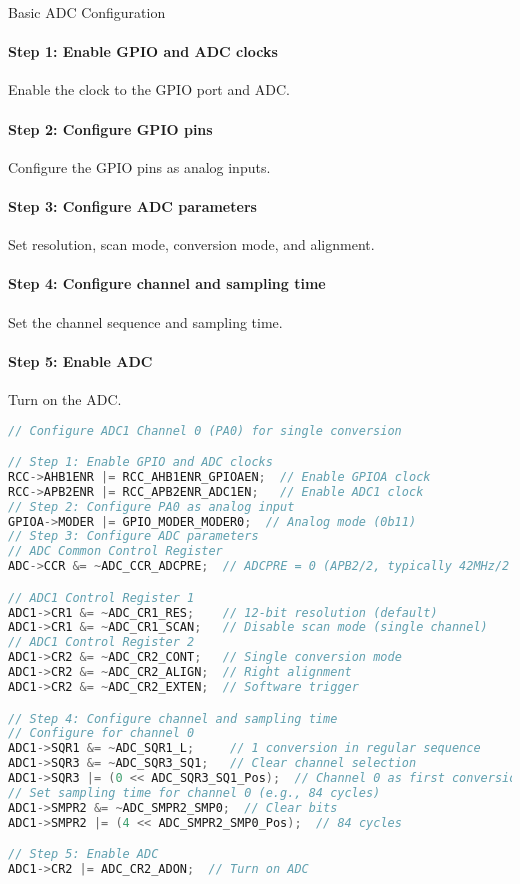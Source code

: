\multend

\begin{KR}{Basic ADC Configuration}
\paragraph{Step 1: Enable GPIO and ADC clocks}
Enable the clock to the GPIO port and ADC.
\paragraph{Step 2: Configure GPIO pins}
Configure the GPIO pins as analog inputs.
\paragraph{Step 3: Configure ADC parameters}
Set resolution, scan mode, conversion mode, and alignment.
\paragraph{Step 4: Configure channel and sampling time}
Set the channel sequence and sampling time.
\paragraph{Step 5: Enable ADC}
Turn on the ADC.

\begin{lstlisting}[language=C, style=basesmol]
// Configure ADC1 Channel 0 (PA0) for single conversion

// Step 1: Enable GPIO and ADC clocks
RCC->AHB1ENR |= RCC_AHB1ENR_GPIOAEN;  // Enable GPIOA clock
RCC->APB2ENR |= RCC_APB2ENR_ADC1EN;   // Enable ADC1 clock
// Step 2: Configure PA0 as analog input
GPIOA->MODER |= GPIO_MODER_MODER0;  // Analog mode (0b11)
// Step 3: Configure ADC parameters
// ADC Common Control Register
ADC->CCR &= ~ADC_CCR_ADCPRE;  // ADCPRE = 0 (APB2/2, typically 42MHz/2 = 21MHz)

// ADC1 Control Register 1
ADC1->CR1 &= ~ADC_CR1_RES;    // 12-bit resolution (default)
ADC1->CR1 &= ~ADC_CR1_SCAN;   // Disable scan mode (single channel)
// ADC1 Control Register 2
ADC1->CR2 &= ~ADC_CR2_CONT;   // Single conversion mode
ADC1->CR2 &= ~ADC_CR2_ALIGN;  // Right alignment
ADC1->CR2 &= ~ADC_CR2_EXTEN;  // Software trigger

// Step 4: Configure channel and sampling time
// Configure for channel 0
ADC1->SQR1 &= ~ADC_SQR1_L;     // 1 conversion in regular sequence
ADC1->SQR3 &= ~ADC_SQR3_SQ1;   // Clear channel selection
ADC1->SQR3 |= (0 << ADC_SQR3_SQ1_Pos);  // Channel 0 as first conversion
// Set sampling time for channel 0 (e.g., 84 cycles)
ADC1->SMPR2 &= ~ADC_SMPR2_SMP0;  // Clear bits
ADC1->SMPR2 |= (4 << ADC_SMPR2_SMP0_Pos);  // 84 cycles

// Step 5: Enable ADC
ADC1->CR2 |= ADC_CR2_ADON;  // Turn on ADC
\end{lstlisting}
\end{KR}

